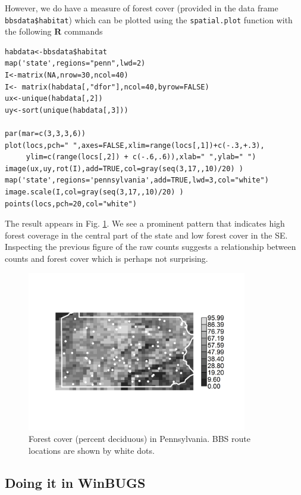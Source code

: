 However, we do have a measure of forest cover (provided in the data frame
\mbox{\tt bbsdata\$habitat}) which can be plotted using the 
\mbox{\tt spatial.plot} function with the following {\bf R} commands
{\small
\begin{verbatim}
habdata<-bbsdata$habitat
map('state',regions="penn",lwd=2)
I<-matrix(NA,nrow=30,ncol=40)
I<- matrix(habdata[,"dfor"],ncol=40,byrow=FALSE)
ux<-unique(habdata[,2])
uy<-sort(unique(habdata[,3]))

par(mar=c(3,3,3,6))
plot(locs,pch=" ",axes=FALSE,xlim=range(locs[,1])+c(-.3,+.3),
     ylim=c(range(locs[,2]) + c(-.6,.6)),xlab=" ",ylab=" ")
image(ux,uy,rot(I),add=TRUE,col=gray(seq(3,17,,10)/20) )
map('state',regions='pennsylvania',add=TRUE,lwd=3,col="white")
image.scale(I,col=gray(seq(3,17,,10)/20) )
points(locs,pch=20,col="white")
\end{verbatim}
}
{\flushleft The} result appears in Fig. \ref{glms.fig.paforest}.
We see a prominent pattern that indicates high forest coverage in the
central part of the state and low forest cover in the SE.  Inspecting
the previous figure of the raw counts suggests a relationship between
counts and forest cover which is perhaps not surprising.
\begin{figure}
\begin{center}
\includegraphics[height=2.75in]{Ch3-Bayes/figs/paforest}
\end{center}
\caption{Forest cover (percent deciduous) in Pennsylvania. BBS route
  locations are shown by white dots. }
\label{glms.fig.paforest}
\end{figure}

\subsection{Doing it in WinBUGS}

